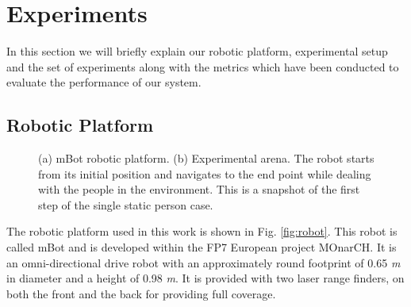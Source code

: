 \section{Experiments}
\label{exp}
In this section we will briefly explain our robotic platform, experimental setup and the set of experiments along with the metrics which have been conducted to evaluate the performance of our system.

\subsection{Robotic Platform}
\label{sec:robot}

\begin{figure}[t!]
\centering
{}%
\hspace{0.4cm}
%
\hspace{0.1cm}

\caption{(a) mBot robotic platform. (b) Experimental arena. The robot starts from its initial position and navigates to the end point while dealing with the people in the environment. This is a snapshot of the first step of the single static person case.}
\label{fig:setup}
\end{figure}




The robotic platform used in this work is shown in Fig. \ref{fig:robot}. This robot is called mBot \cite{Messias2014robotic} and is developed within the FP7 European project MOnarCH.
It is an omni-directional drive robot with an approximately round footprint of 0.65 \textit{m} in diameter and a height of 0.98 \textit{m}.
It is provided with two laser range finders, on both the front and the back for providing full coverage.

